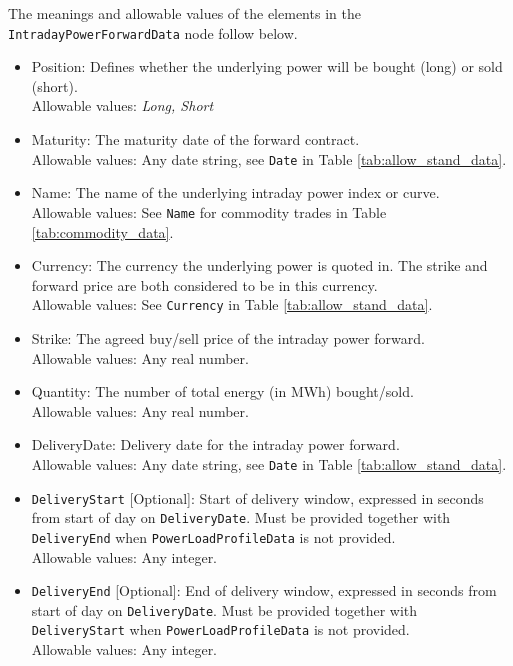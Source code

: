 The meanings and allowable values of the elements in the \lstinline!IntradayPowerForwardData! node follow below.

\begin{itemize}
\item Position: Defines whether the underlying power will be bought (long) or sold (short). \\
Allowable values: \emph{Long, Short}

\item Maturity: The maturity date of the forward contract. \\
Allowable values: Any date string, see \lstinline!Date! in Table \ref{tab:allow_stand_data}.

\item Name: The name of the underlying intraday power index or curve. \\
Allowable values: See \lstinline!Name! for commodity trades in Table \ref{tab:commodity_data}.

\item Currency: The currency the underlying power is quoted in. The strike and forward price are both considered to be in this currency. \\
Allowable values: See \lstinline!Currency! in Table \ref{tab:allow_stand_data}.

\item Strike: The agreed buy/sell price of the intraday power forward. \\
Allowable values: Any real number.

\item Quantity: The number of total energy (in MWh) bought/sold. \\
Allowable values: Any real number.

\item DeliveryDate: Delivery date for the intraday power forward. \\
Allowable values: Any date string, see \lstinline!Date! in Table \ref{tab:allow_stand_data}.

\item \lstinline!DeliveryStart! [Optional]: Start of delivery window, expressed in seconds from start of day on \lstinline!DeliveryDate!. Must be provided together with \lstinline!DeliveryEnd! when \lstinline!PowerLoadProfileData! is not provided. \\
Allowable values: Any integer.

\item \lstinline!DeliveryEnd! [Optional]: End of delivery window, expressed in seconds from start of day on \lstinline!DeliveryDate!. Must be provided together with \lstinline!DeliveryStart! when \lstinline!PowerLoadProfileData! is not provided. \\
Allowable values: Any integer.


\end{itemize}
